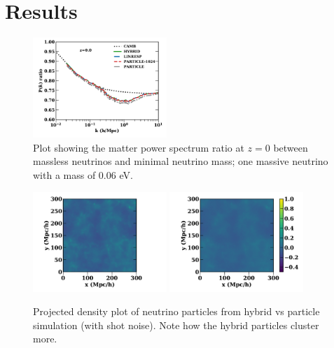 \documentclass[useAMS, usenatbib]{mnras}
\begin{document}

%


\section{Results}
\label{sec:results}

\begin{figure}
\includegraphics[width=0.45\textwidth]{nuplots/pks_rel-10.pdf}
\caption{Plot showing the matter power spectrum ratio at $z=0$ between massless neutrinos and minimal neutrino mass; one massive neutrino with a mass of $0.06$ eV.
}
  \label{fig:minimal_mass}
\end{figure}

\begin{figure}
\includegraphics[width=0.45\textwidth]{nuplots/dens-plt-b300p512nu0_4hybt2.pdf}
\includegraphics[width=0.45\textwidth]{nuplots/dens-plt-b300p512nu0_4pt2.pdf}
  \caption{Projected density plot of neutrino particles from hybrid vs particle simulation (with shot noise). Note how the hybrid particles cluster more.}
  \label{fig:nu_density_plot}
\end{figure}
\end{document}
